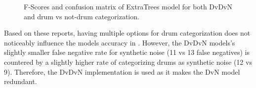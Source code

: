 \documentclass[\main/thesis.tex]{subfiles}
\begin{document}
\begin{figure}[htbp!]
\begin{center}
\end{center}


\caption{F-Scores and confusion matrix of ExtraTrees model for both DvDvN and drum vs not-drum categorization.}
\label{fig:conf_f1_dvn}
\end{figure}

Based on these reports, having multiple options for drum categorization does not noticeably influence the models accuracy in \decfirst. However, the DvDvN models's slightly smaller false negative rate for synthetic noise (11 vs 13 false negatives) is countered by a slightly higher rate of categorizing drums as synthetic noise (12 vs 9). Therefore, the DvDvN implementation is used as it makes the DvN model redundant.
\end{document}
